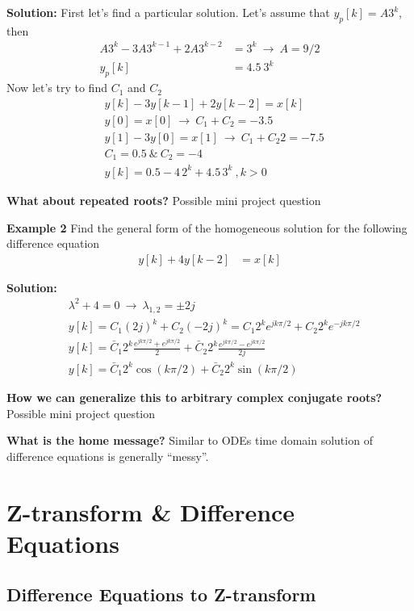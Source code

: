 \documentclass[twoside]{article}
\begin{document}
\textbf{Solution:} First let's find a particular solution. 
Let's assume that $y_p[k] = A 3^k$, then
%
\begin{align*}
A 3^k - 3 A 3^{k-1} + 2 A 3^{k-2} &= 3^k \ \rightarrow \ A = 9/2
\\
y_p[k] &= 4.5 \ 3^k
\end{align*}
%
Now let's try to find $C_1$ and $C_2$
%
\begin{align*}
&y[k] - 3 y[k-1] + 2 y[k-2] = x[k]
\\
&y[0] = x[0] \ \rightarrow \ C_1 + C_2 = -3.5 \\
&y[1] - 3 y[0] = x[1] \ \rightarrow \ C_1 + C_2 2 = -7.5
\\
&C_1 = 0.5 \ \& \ C_2 = -4
\\
&y[k] = 0.5 - 4 \, 2^k + 4.5 \, 3^k \ , k > 0 
\end{align*}

\textbf{What about repeated roots?} Possible mini project question


\textbf{Example 2} Find the general form of the homogeneous solution
for the following difference equation
%
\begin{align*}
  y[k] + 4 y[k-2] &= x[k]
\end{align*}

\textbf{Solution:}
%
\begin{align*}
&\lambda^2 + 4 = 0 \ \rightarrow \ \lambda_{1,2} = \pm 2 j
\\
&y[k] = C_1 (2j)^k + C_2 (-2j)^k = C_1 2^k e^{j k \pi/2 } + C_2 2^k e^{-j
k  \pi/2 }  
\\
&y[k] = \bar{C}_1 2^k \frac{ e^{j k \pi/2} + e^{j k \pi / 2} }{2} +
  \bar{C}_2 2^k \frac{ e^{j k \pi / 2} - e^{j k \pi / 2} }{2 j}
\\
&y[k] = \bar{C}_1 2^k \cos(k \pi /2) + \bar{C}_2 2^k \sin(k \pi /2)
\end{align*}

\textbf{How we can generalize this to arbitrary complex conjugate
  roots?} Possible mini project question

\textbf{What is the home message?} Similar to ODEs time domain
solution of difference equations is generally ``messy''.

\section*{Z-transform \& Difference Equations}

\subsection*{Difference Equations to Z-transform}
\end{document}
